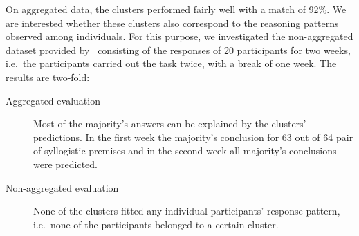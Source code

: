 \documentclass[12pt]{article}
\begin{document}
On aggregated data, the clusters performed fairly well with a match of 92\%. 
We are interested whether these clusters also correspond to the reasoning patterns observed among individuals. 
For this purpose, we investigated the non-aggregated dataset provided by~\cite{khemlani:2016} consisting of the responses of 20 participants for two weeks,
i.e.\ the participants carried out the task twice, with a break of one week. 
The results are two-fold:
\begin{description}
 \item[Aggregated evaluation] Most of the majority's answers can be explained by the clusters' predictions. In the first week 
 the majority's conclusion for 63 out of 64 pair of syllogistic premises and in the second week
 all majority's conclusions were predicted.
\item[Non-aggregated evaluation] None of the clusters fitted any individual participants' response pattern, i.e.\ none of the participants belonged to a certain cluster.
\end{description}
\end{document}

